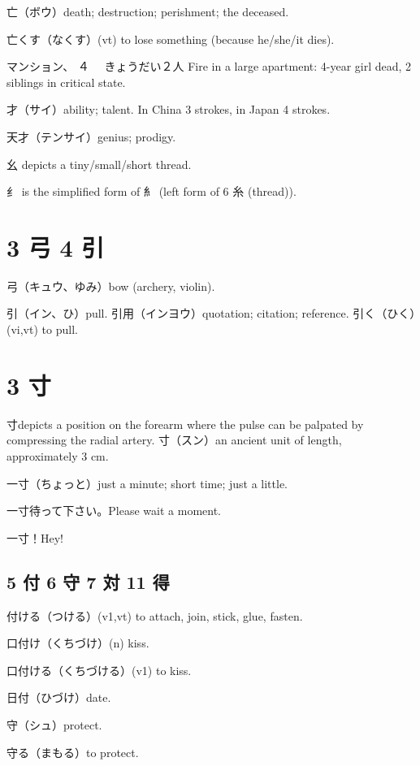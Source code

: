 亡（ボウ）death; destruction; perishment; the deceased.

亡くす（なくす）(vt) to lose something (because he/she/it dies).

マンション、%
４%
　きょうだい２人
Fire in a large apartment: 4-year girl dead, 2 siblings in critical state.

才（サイ）ability; talent.
In China 3 strokes, in Japan 4 strokes.

天才（テンサイ）genius; prodigy.

幺 depicts a tiny/small/short thread.

纟 is the simplified form of 糹
(left form of 6 糸 (thread)).

\section{3 弓 4 引}

弓（キュウ、ゆみ）bow (archery, violin).

引（イン、ひ）pull.
引用（インヨウ）quotation; citation; reference.
引く（ひく）(vi,vt) to pull.

\section{3 寸}

寸depicts a position on the forearm
where the pulse can be palpated by compressing the radial artery.
寸（スン）an ancient unit of length, approximately 3 cm.

一寸（ちょっと）just a minute; short time; just a little.

一寸待って下さい。Please wait a moment.

一寸！Hey!

\subsection{5 付 6 守 7 対 11 得}

付ける（つける）(v1,vt) to attach, join, stick, glue, fasten.

口付け（くちづけ）(n) kiss.

口付ける（くちづける）(v1) to kiss.

日付（ひづけ）date.

守（シュ）protect.

守る（まもる）to protect.

